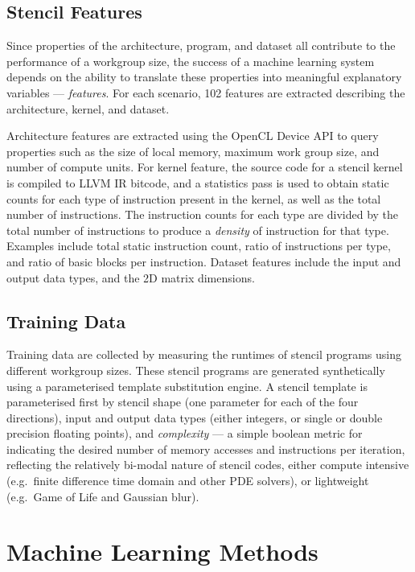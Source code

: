 \documentclass[nonatbib,preprint,10pt]{sigplanconf}
\begin{document}
\subsection{Stencil Features}

Since properties of the architecture, program, and dataset all
contribute to the performance of a workgroup size, the success of a
machine learning system depends on the ability to translate these
properties into meaningful explanatory variables ---
\emph{features}. For each scenario, 102 features are extracted
describing the architecture, kernel, and dataset.

Architecture features are extracted using the OpenCL Device API to
query properties such as the size of local memory, maximum work group
size, and number of compute units. For kernel feature, the source code
for a stencil kernel is compiled to LLVM IR bitcode, and a statistics
pass is used to obtain static counts for each type of instruction
present in the kernel, as well as the total number of
instructions. The instruction counts for each type are divided by the
total number of instructions to produce a \emph{density} of
instruction for that type. Examples include total static instruction
count, ratio of instructions per type, and ratio of basic blocks per
instruction. Dataset features include the input and output data types,
and the 2D matrix dimensions.


\subsection{Training Data}\label{subsec:training}

Training data are collected by measuring the runtimes of stencil
programs using different workgroup sizes. These stencil programs are
generated synthetically using a parameterised template substitution
engine. A stencil template is parameterised first by stencil shape
(one parameter for each of the four directions), input and output data
types (either integers, or single or double precision floating
points), and \emph{complexity} --- a simple boolean metric for
indicating the desired number of memory accesses and instructions per
iteration, reflecting the relatively bi-modal nature of stencil codes,
either compute intensive (e.g.\ finite difference time domain and
other PDE solvers), or lightweight (e.g.\ Game of Life and Gaussian
blur).


\section{Machine Learning Methods}
\end{document}
